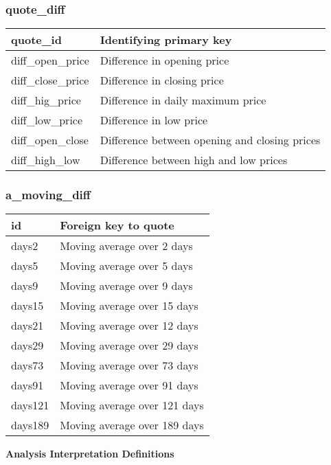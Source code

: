 \subsubsection{quote\_diff}
\begin{tabular}{|l||l|}
	\hline
	quote\_id 				& Identifying primary key \\ \hline
	diff\_open\_price		& Difference in opening price \\ \hline
	diff\_close\_price		& Difference in closing price \\ \hline
	diff\_hig\_price		& Difference in daily maximum price \\ \hline
	diff\_low\_price		& Difference in low price \\ \hline
	diff\_open\_close		& Difference between opening and closing prices\\ \hline
	diff\_high\_low			& Difference between high and low prices\\ \hline
\end{tabular}
\subsubsection{a\_moving\_diff}
\begin{tabular}{|l||l|}
	\hline
	id 				& Foreign key to quote \\ \hline
	days2			& Moving average over 2 days \\ \hline
	days5			& Moving average over 5 days \\ \hline
	days9			& Moving average over 9 days \\ \hline
	days15			& Moving average over 15 days \\ \hline
	days21			& Moving average over 12 days \\ \hline
	days29			& Moving average over 29 days \\ \hline
	days73			& Moving average over 73 days \\ \hline
	days91			& Moving average over 91 days \\ \hline
	days121			& Moving average over 121 days \\ \hline
	days189			& Moving average over 189 days \\ \hline
\end{tabular}

\par \textbf{Analysis Interpretation Definitions}
